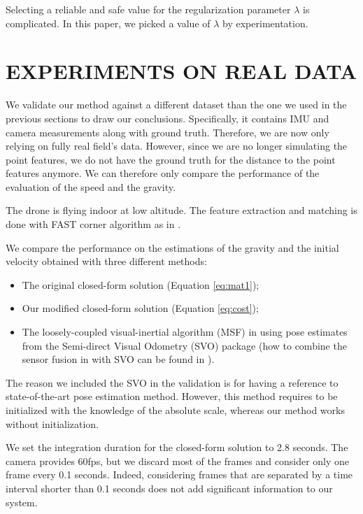 \documentclass[letterpaper, 10 pt, conference]{ieeeconf}  %
\begin{document}
Selecting a reliable and safe value for the regularization parameter $\lambda$ is complicated.
In this paper, we picked a value of $\lambda$ by experimentation.

\section{EXPERIMENTS ON REAL DATA}\label{SectionPerformance}

We validate our method against a different dataset than the one we used in the previous sections to draw our conclusions.
Specifically, it contains IMU and camera measurements along with ground truth.
Therefore, we are now only relying on fully real field's data.
However, since we are no longer simulating the point features, we do not have the ground truth for the distance to the point features anymore.
We can therefore only compare the performance of the evaluation of the speed and the gravity.

The drone is flying indoor at low altitude.
The feature extraction and matching is done with FAST corner algorithm as in \cite{Forster2014}.

We compare the performance on the estimations of the gravity and the initial velocity obtained with three different methods:
\begin{itemize}
\item The original closed-form solution (Equation \ref{eq:mat1});
\item Our modified closed-form solution (Equation \ref{eq:cost});
\item The loosely-coupled visual-inertial algorithm (MSF) in \cite{LynenIROS13} using pose estimates from the Semi-direct Visual Odometry (SVO) package \cite{Forster2014} (how to combine the sensor fusion in \cite{LynenIROS13} with SVO can be found in \cite{FaesslerICRA15}).
\end{itemize}
The reason we included the SVO in the validation is for having a reference to state-of-the-art pose estimation method.
However, this method requires to be initialized with the knowledge of the absolute scale, whereas our method works without initialization.

We set the integration duration for the closed-form solution to 2.8 seconds.
The camera provides 60fps, but we discard most of the frames and consider only one frame every 0.1 seconds.
Indeed, considering frames that are separated by a time interval shorter than 0.1 seconds does not add significant information to our system.
\end{document}

